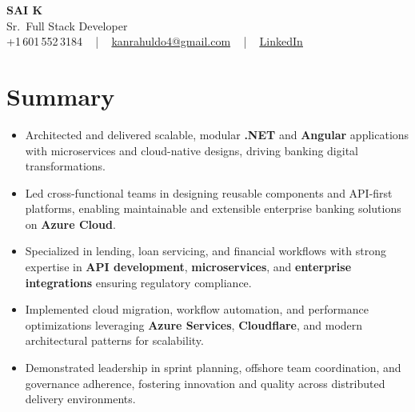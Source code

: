 \documentclass[letterpaper,11pt]{article}
\newcommand{\resumeItem}[1]{
  \item\footnotesize{
    {#1 \vspace{-2pt}}
  }
}
\newcommand{\resumeItemListStart}{\begin{itemize}[leftmargin=*]}
\newcommand{\resumeItemListEnd}{\end{itemize}\vspace{-5pt}}
\begin{document}
\begin{center}
    {\fontsize{14pt}{12pt}\selectfont \textbf{\MakeUppercase{Sai K}}}\\ \vspace{2pt}
    \fontsize{10pt}{12pt}\selectfont Sr.\ Full Stack Developer\\ \vspace{2pt}
    \fontsize{10pt}{12pt}\selectfont +1\,601\,552\,3184 ~ | ~
    \href{mailto:kanrahuldo4@gmail.com}{kanrahuldo4@gmail.com} ~ | ~
    \href{https://www.linkedin.com/in/srrrk/}{\color{blue}\underline{LinkedIn}}
    \vspace{-10pt}
\end{center}

\section{Summary}
\fontsize{9pt}{10pt}\selectfont
\resumeItemListStart
  \resumeItem{Architected and delivered scalable, modular \textbf{.NET} and \textbf{Angular} applications with microservices and cloud-native designs, driving banking digital transformations.}
  \resumeItem{Led cross-functional teams in designing reusable components and API-first platforms, enabling maintainable and extensible enterprise banking solutions on \textbf{Azure Cloud}.}
  \resumeItem{Specialized in lending, loan servicing, and financial workflows with strong expertise in \textbf{API development}, \textbf{microservices}, and \textbf{enterprise integrations} ensuring regulatory compliance.}
  \resumeItem{Implemented cloud migration, workflow automation, and performance optimizations leveraging \textbf{Azure Services}, \textbf{Cloudflare}, and modern architectural patterns for scalability.}
  \resumeItem{Demonstrated leadership in sprint planning, offshore team coordination, and governance adherence, fostering innovation and quality across distributed delivery environments.}
\resumeItemListEnd
\vspace{-6pt}

\end{document}
